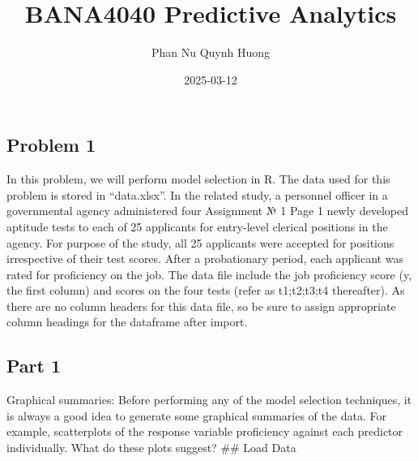 \documentclass[
]{article}
\title{BANA4040 Predictive Analytics}
\author{Phan Nu Quynh Huong}
\date{2025-03-12}
\begin{document}
\maketitle

\subsection{Problem 1}\label{problem-1}

In this problem, we will perform model selection in R. The data used for
this problem is stored in ``data.xlsx''. In the related study, a
personnel officer in a governmental agency administered four Assignment
№ 1 Page 1 newly developed aptitude tests to each of 25 applicants for
entry-level clerical positions in the agency. For purpose of the study,
all 25 applicants were accepted for positions irrespective of their test
scores. After a probationary period, each applicant was rated for
proficiency on the job. The data file include the job proficiency score
(y, the first column) and scores on the four tests (refer as t1;t2;t3;t4
thereafter). As there are no column headers for this data file, so be
sure to assign appropriate column headings for the dataframe after
import.

\subsection{Part 1}\label{part-1}

Graphical summaries: Before performing any of the model selection
techniques, it is always a good idea to generate some graphical
summaries of the data. For example, scatterplots of the response
variable proficiency against each predictor individually. What do these
plots suggest? \#\# Load Data
\end{document}
